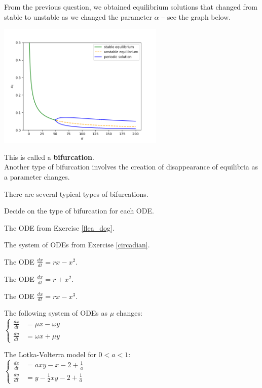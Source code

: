 

\begin{slide}
\question

From the previous question, we obtained equilibrium solutions that changed from stable to unstable as we changed the parameter $\alpha$ -- see the graph below.
	\begin{center}
		\includegraphics[width=225pt]{images/circadian5-periodic.png}
	\end{center}

This is called a \textbf{bifurcation}. \\


Another type of bifurcation involves the creation of disappearance of equilibria as a parameter changes.

There are several typical types of bifurcations.

\end{slide}


\begin{slide}


Decide on the type of bifurcation for each ODE.

\begin{parts}
	\item The ODE from Exercise \ref{flea_dog}.
	\item The system of ODEs from Exercise \ref{circadian}.
	\item The ODE $\frac{dx}{dt} = rx - x^2$.
	\item The ODE $\frac{dx}{dt} = r + x^2$.
	\item The ODE $\frac{dx}{dt} = rx - x^3$.
	\item The following system of ODEs as $\mu$ changes: \\
	$ \begin{cases}
 		\frac{dx}{dt} & = \mu x -  \omega y \\[5pt]
 		\frac{dy}{dt} & = \omega x + \mu y
	\end{cases}
	$
	\item The Lotka-Volterra model for $0< a < 1$: \\
	$ \begin{cases}
 		\frac{dx}{dt} & = a xy - x - 2 + \frac1a\\[5pt]
 		\frac{dy}{dt} & = y - \frac12 xy - 2 + \frac1a
	\end{cases}
	$
\end{parts}
	
	
\end{slide}



